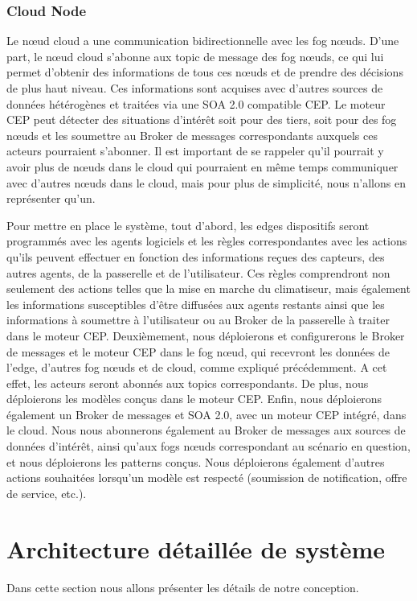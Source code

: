 \subsubsection{Cloud Node}
Le nœud cloud a une communication bidirectionnelle avec les fog  nœuds. D'une part, le nœud cloud s'abonne aux topic de message des fog nœuds, ce qui lui permet d'obtenir des informations de tous ces nœuds et de prendre des décisions de plus haut niveau. Ces informations sont acquises avec d'autres sources de données hétérogènes et traitées via une SOA 2.0 compatible CEP. Le moteur CEP peut détecter des situations d'intérêt soit pour des tiers, soit pour des fog nœuds et les soumettre au Broker de messages correspondants auxquels ces acteurs pourraient s'abonner. Il est important de se rappeler qu'il pourrait y avoir plus de nœuds dans le cloud qui pourraient en même temps communiquer avec d'autres nœuds dans le cloud, mais pour plus de simplicité, nous n'allons en représenter qu'un.


Pour mettre en place le système, tout d'abord, les edges dispositifs  seront programmés avec les agents logiciels et les règles correspondantes avec les actions qu'ils peuvent effectuer en fonction des informations reçues des capteurs, des autres agents, de la passerelle et de l'utilisateur. Ces règles comprendront non seulement des actions telles que la mise en marche du climatiseur, mais également les informations susceptibles d'être diffusées aux agents restants ainsi que les informations à soumettre à l'utilisateur ou au Broker de la passerelle à traiter dans le moteur CEP. Deuxièmement, nous déploierons et configurerons le Broker  de messages et le moteur CEP dans le fog nœud, qui recevront les données de l’edge, d'autres fog nœuds et de cloud, comme expliqué précédemment. A cet effet, les acteurs seront abonnés aux topics  correspondants. De plus, nous déploierons les modèles conçus dans le moteur CEP. Enfin, nous déploierons également un Broker de messages et SOA 2.0, avec un moteur CEP intégré, dans le cloud. Nous nous abonnerons également au Broker  de messages aux sources de données d'intérêt, ainsi qu'aux fogs nœuds correspondant au scénario en question, et nous déploierons les patterns conçus. Nous déploierons également d'autres actions souhaitées lorsqu'un modèle est respecté (soumission de notification, offre de service, etc.).


\section{Architecture détaillée de système}
Dans cette section nous allons présenter les détails de notre conception.
